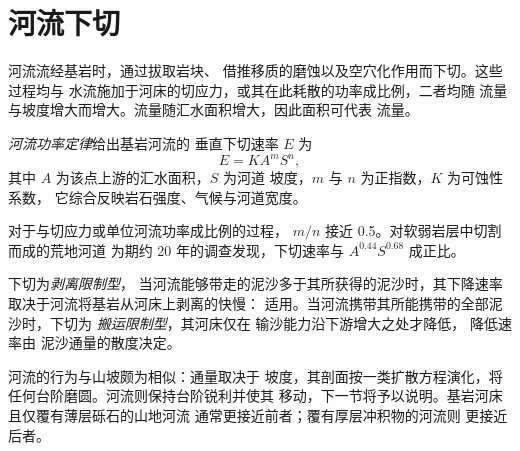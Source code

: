 \section{河流下切}\label{sec:b3:quantitative-geomorphology:rivers}

河流流经基岩时，通过拔取岩块、
借推移质的磨蚀以及空穴化作用而下切。这些过程均与
水流施加于河床的切应力，或其在此耗散的功率成比例，二者均随
流量与坡度增大而增大。流量随汇水面积增大，因此面积可代表
流量。

\begin{definition}[河流功率定律]\label{def:b3:quantitative-geomorphology:stream-power}
\emph{河流功率定律}给出基岩河流的
垂直下切速率 $E$ 为
\[
E = K A^m S^n ,
\]
其中 $A$ 为该点上游的汇水面积，$S$ 为河道
坡度，$m$ 与 $n$ 为正指数，$K$ 为可蚀性系数，
它综合反映岩石强度、气候与河道宽度。
\end{definition}

对于与切应力或单位河流功率成比例的过程，
$m/n$ 接近 0.5。对软弱岩层中切割而成的荒地河道
为期约 20 年的调查发现，下切速率与 $A^{0.44}S^{0.68}$ 成正比。

\begin{definition}[剥离限制型与搬运限制型下切]\label{def:b3:quantitative-geomorphology:limited}
下切为\emph{剥离限制型}，
当河流能够带走的泥沙多于其所获得的泥沙时，其下降速率
取决于河流将基岩从河床上剥离的快慢：
适用。当河流携带其所能携带的全部泥沙时，下切为
\emph{搬运限制型}，其河床仅在
输沙能力沿下游增大之处才降低，
降低速率由
泥沙通量的散度决定。
\end{definition}

河流的行为与山坡颇为相似：通量取决于
坡度，其剖面按一类扩散方程演化，将
任何台阶磨圆。河流则保持台阶锐利并使其
移动，下一节将予以说明。基岩河床且仅覆有薄层砾石的山地河流
通常更接近前者；覆有厚层冲积物的河流则
更接近后者。

